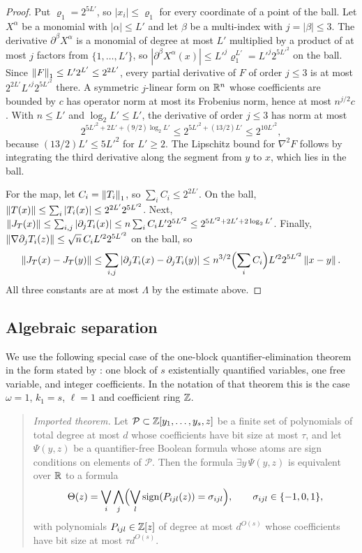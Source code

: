 \begin{proof}
Put $\varrho_1=2^{5L'}$, so $|x_i|\le\varrho_1$ for every coordinate of a
point of the ball. Let $X^\alpha$ be a monomial with $|\alpha|\le L'$ and let
$\beta$ be a multi-index with $j=|\beta|\le3$. The derivative
$\partial^\beta X^\alpha$ is a monomial of degree at most $L'$ multiplied by a
product of at most $j$ factors from $\{1,\ldots,L'\}$, so
$|\partial^\beta X^\alpha(x)|\le L'^j\varrho_1^{L'}=L'^j2^{5L'^2}$ on the
ball. Since $\left\lVert F\right\rVert_1\le L'2^{L'}\le2^{2L'}$, every partial derivative of
$F$ of order $j\le3$ is at most $2^{2L'}L'^j2^{5L'^2}$ there. A symmetric
$j$-linear form on $\mathbb R^n$ whose coefficients are bounded by $c$ has operator
norm at most its Frobenius norm, hence at most $n^{j/2}c$. With $n\le L'$
and $\log_2L'\le L'$, the derivative of order $j\le3$ has norm at most
\[
 2^{5L'^2+2L'+(9/2)\log_2L'}\le2^{5L'^2+(13/2)L'}\le2^{10L'^2},
\]
because $(13/2)L'\le5L'^2$ for $L'\ge2$. The Lipschitz bound for $\nabla^2F$
follows by integrating the third derivative along the segment from $y$ to
$x$, which lies in the ball.

For the map, let $C_i=\left\lVert T_i\right\rVert_1$, so $\sum_iC_i\le2^{2L'}$. On the ball,
$\left\lVert T(x)\right\rVert\le\sum_i|T_i(x)|\le2^{2L'}2^{5L'^2}$. Next,
$\left\lVert J_T(x)\right\rVert\le\sum_{i,j}|\partial_jT_i(x)|\le n\sum_iC_iL'2^{5L'^2}
\le2^{5L'^2+2L'+2\log_2L'}$. Finally,
$\left\lVert\nabla\partial_jT_i(z)\right\rVert\le\sqrt n\,C_iL'^22^{5L'^2}$ on the ball, so
\[
 \left\lVert J_T(x)-J_T(y)\right\rVert\le\sum_{i,j}|\partial_jT_i(x)-\partial_jT_i(y)|
 \le n^{3/2}\Bigl(\sum_iC_i\Bigr)L'^22^{5L'^2}\left\lVert x-y\right\rVert.
\]
All three constants are at most $\Lambda$ by the estimate above.
\end{proof}

\subsection{Algebraic separation}
\label{app:upper-separation}

We use the following special case of the one-block quantifier-elimination
theorem in the form stated by \citet[Theorem~2.27]{Basu2014}: one block of
$s$ existentially quantified variables, one free variable, and integer
coefficients. In the notation of that theorem this is the case $\omega=1$,
$k_1=s$, $\ell=1$ and coefficient ring $\mathbb Z$.

\begin{quote}
\emph{Imported theorem.} Let $\mathcal P\subset\mathbb Z[y_1,\ldots,y_s,z]$ be a
finite set of polynomials of total degree at most $d$ whose coefficients
have bit size at most $\tau$, and let $\Psi(y,z)$ be a quantifier-free
Boolean formula whose atoms are sign conditions on elements of $\mathcal P$.
Then the formula $\exists y\,\Psi(y,z)$ is equivalent over $\mathbb R$ to a
formula
\[
 \Theta(z)=\bigvee_i\bigwedge_j\Bigl(\bigvee_l
 \operatorname{sign}(P_{ijl}(z))=\sigma_{ijl}\Bigr),
 \qquad \sigma_{ijl}\in\{-1,0,1\},
\]
with polynomials $P_{ijl}\in\mathbb Z[z]$ of degree at most $d^{O(s)}$ whose
coefficients have bit size at most $\tau d^{O(s)}$.
\end{quote}

